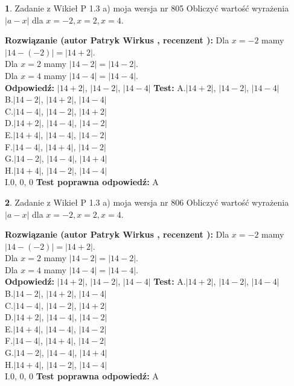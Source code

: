 \documentclass[12pt, a4paper]{article}
\theoremstyle{definition} %
\newtheorem{zad}{}
\newcommand{\zadStart}[1]{\begin{zad}#1\newline}
\newcommand{\zadStop}{\end{zad}}
\newcommand{\rozwStart}[2]{\noindent \textbf{Rozwiązanie (autor #1 , recenzent #2): }\newline}
\newcommand{\rozwStop}{\newline}
\newcommand{\odpStart}{\noindent \textbf{Odpowiedź:}\newline}
\newcommand{\odpStop}{\newline}
\newcommand{\testStart}{\noindent \textbf{Test:}\newline}
\newcommand{\testStop}{\newline}
\newcommand{\kluczStart}{\noindent \textbf{Test poprawna odpowiedź:}\newline}
\newcommand{\kluczStop}{\newline}
\begin{document}
\zadStart{Zadanie z Wikieł P 1.3 a) moja wersja nr 805}
Obliczyć wartość wyrażenia $|a - x|$ dla $x=-2,x=2,x=4$.
\zadStop
\rozwStart{Patryk Wirkus}{}
Dla $x = -2$ mamy $|14 - (-2)| = |14 + 2|$.\\
Dla $x = 2$ mamy $|14 - 2| = |14 - 2|$.\\
Dla $x = 4$ mamy $|14 - 4| = |14 - 4|$.\\
\rozwStop
\odpStart
$|14 + 2|$, $|14 - 2|$, $|14 - 4|$
\odpStop
\testStart
A.$|14 + 2|$, $|14 - 2|$, $|14 - 4|$\\
B.$|14 - 2|$, $|14 + 2|$, $|14 - 4|$\\
C.$|14 - 4|$, $|14 - 2|$, $|14 + 2|$\\
D.$|14 + 2|$, $|14 - 4|$, $|14 - 2|$\\
E.$|14 + 4|$, $|14 - 4|$, $|14 - 2|$\\
F.$|14 - 4|$, $|14 + 4|$, $|14 - 2|$\\
G.$|14 - 2|$, $|14 - 4|$, $|14 + 4|$\\
H.$|14 + 4|$, $|14 - 2|$, $|14 - 4|$\\
I.$0$, $0$, $0$
\testStop
\kluczStart
A
\kluczStop



\zadStart{Zadanie z Wikieł P 1.3 a) moja wersja nr 806}
Obliczyć wartość wyrażenia $|a - x|$ dla $x=-2,x=2,x=4$.
\zadStop
\rozwStart{Patryk Wirkus}{}
Dla $x = -2$ mamy $|14 - (-2)| = |14 + 2|$.\\
Dla $x = 2$ mamy $|14 - 2| = |14 - 2|$.\\
Dla $x = 4$ mamy $|14 - 4| = |14 - 4|$.\\
\rozwStop
\odpStart
$|14 + 2|$, $|14 - 2|$, $|14 - 4|$
\odpStop
\testStart
A.$|14 + 2|$, $|14 - 2|$, $|14 - 4|$\\
B.$|14 - 2|$, $|14 + 2|$, $|14 - 4|$\\
C.$|14 - 4|$, $|14 - 2|$, $|14 + 2|$\\
D.$|14 + 2|$, $|14 - 4|$, $|14 - 2|$\\
E.$|14 + 4|$, $|14 - 4|$, $|14 - 2|$\\
F.$|14 - 4|$, $|14 + 4|$, $|14 - 2|$\\
G.$|14 - 2|$, $|14 - 4|$, $|14 + 4|$\\
H.$|14 + 4|$, $|14 - 2|$, $|14 - 4|$\\
I.$0$, $0$, $0$
\testStop
\kluczStart
A
\kluczStop
\end{document}
